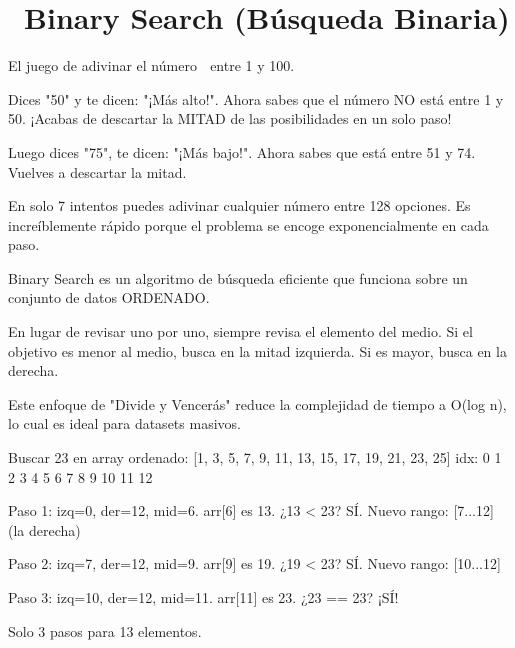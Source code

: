 ﻿\chapter[\emj{🔍}~Binary Search (Búsqueda Binaria)]{~Binary Search (Búsqueda Binaria)}

\begin{dsaquees}

El juego de adivinar el número 🔢 entre 1 y 100. 

Dices "50" y te dicen: "¡Más alto!". 
Ahora sabes que el número NO está entre 1 y 50. ¡Acabas de descartar 
la MITAD de las posibilidades en un solo paso! 

Luego dices "75", te dicen: "¡Más bajo!". 
Ahora sabes que está entre 51 y 74. Vuelves a descartar la mitad.

En solo 7 intentos puedes adivinar cualquier número entre 128 opciones. 
Es increíblemente rápido porque el problema se encoge 
exponencialmente en cada paso.

\end{dsaquees}

\begin{dsaotraforma}

Binary Search es un algoritmo de búsqueda eficiente que funciona sobre
un conjunto de datos ORDENADO. 

En lugar de revisar uno por uno, siempre revisa el elemento del medio. 
Si el objetivo es menor al medio, busca en la mitad izquierda. Si es 
mayor, busca en la derecha. 

Este enfoque de "Divide y Vencerás" reduce la complejidad de tiempo
a O(log n), lo cual es ideal para datasets masivos.

\end{dsaotraforma}

\begin{dsadiagrama}
Buscar 23 en array ordenado:
[1, 3, 5, 7, 9, 11, 13, 15, 17, 19, 21, 23, 25]
 idx: 0  1  2  3  4   5   6   7   8   9  10  11  12

Paso 1: izq=0, der=12, mid=6.
        arr[6] es 13. ¿13 < 23? SÍ.
        Nuevo rango: [7...12] (la derecha)

Paso 2: izq=7, der=12, mid=9.
        arr[9] es 19. ¿19 < 23? SÍ.
        Nuevo rango: [10...12]

Paso 3: izq=10, der=12, mid=11.
        arr[11] es 23. ¿23 == 23? ¡SÍ! 🎉 🎉

Solo 3 pasos para 13 elementos.
\end{dsadiagrama}

